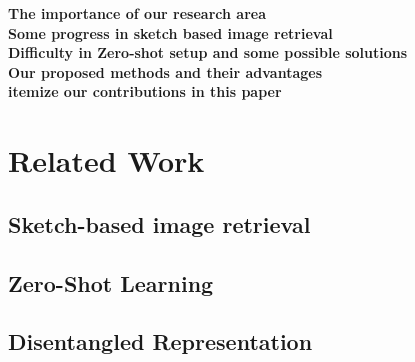 \documentclass[10pt,twocolumn,letterpaper]{article}
\begin{document}
\textbf{The importance of our research area} \\

\textbf{Some progress in sketch based image retrieval} \\

\textbf{Difficulty in Zero-shot setup and some possible solutions} \\

\textbf{Our proposed methods and their advantages} \\

\textbf{itemize our contributions in this paper} \\









\section{Related Work}

\subsection{Sketch-based image retrieval}

\subsection{Zero-Shot Learning}

\subsection{Disentangled Representation}
\end{document}
